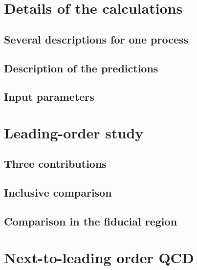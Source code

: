 \documentclass[twocolumn,epjc3]{svjour3} %
\begin{document}


\section{Details of the calculations}
\label{sec:details}

\subsection{Several descriptions for one process}



\subsection{Description of the predictions}



\subsection{Input parameters}



\section{Leading-order study}
\label{sec:LO}

\subsection{Three contributions}



\subsection{Inclusive comparison}



\subsection{Comparison in the fiducial region}





\section{Next-to-leading order QCD}
\label{sec:NLO}
\end{document}
